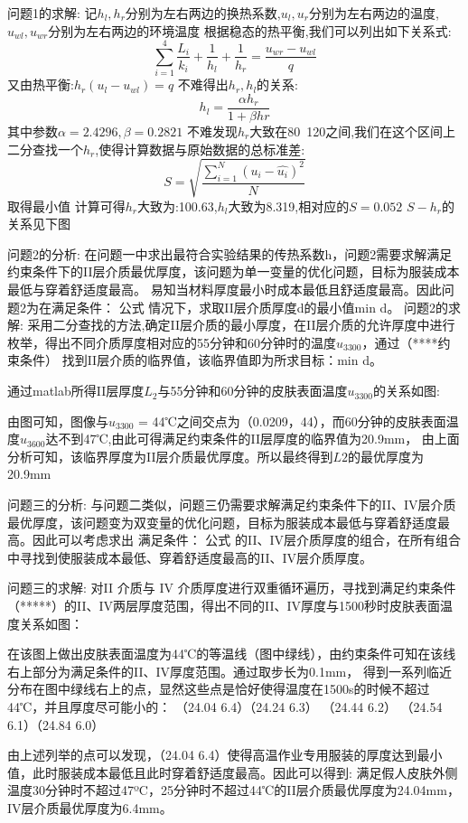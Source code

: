 \documentclass[utf8]{ctexart}
\begin{document}
    问题1的求解:
    记\(h_l,h_r\)分别为左右两边的换热系数,\(u_l,u_r\)分别为左右两边的温度,\(u_{wl},u_{wr}\)分别为左右两边的环境温度
    根据稳态的热平衡,我们可以列出如下关系式:
    \[\sum_{i=1}^4 \frac{L_i}{k_i} + \frac{1}{h_l} + \frac{1}{h_r} = \frac{u_{wr}-u_{wl}}{q}\]
    又由热平衡:\( h_r(u_l-u_{wl}) = q\)
    不难得出\(h_r,h_l\)的关系:
    \[h_l = \frac{\alpha h_r}{1+\beta hr}\]
    其中参数\(\alpha = 2.4296 ,\beta = 0.2821\)
    不难发现\(h_r\)大致在80~120之间,我们在这个区间上二分查找一个\(h_r\),使得计算数据与原始数据的总标准差:
    \[S = \sqrt{\frac{\sum_{i=1}^{N}(u_i-\hat{u_i})^2}{N}}\]
    取得最小值
    计算可得\(h_r\)大致为:100.63,\(h_l\)大致为8.319,相对应的\(S = 0.052\)
    \(S-h_r\)的关系见下图

    问题2的分析:
    在问题一中求出最符合实验结果的传热系数h，问题2需要求解满足约束条件下的II层介质最优厚度，该问题为单一变量的优化问题，目标为服装成本最低与穿着舒适度最高。
    易知当材料厚度最小时成本最低且舒适度最高。因此问题2为在满足条件：
                            公式
    情况下，求取II层介质厚度d的最小值min d。
    问题2的求解:
    采用二分查找的方法,确定II层介质的最小厚度，在II层介质的允许厚度中进行枚举，得出不同介质厚度相对应的55分钟和60分钟时的温度\(u_{3300}\)，通过（****约束条件）
    找到II层介质的临界值，该临界值即为所求目标：min d。

    通过matlab所得II层厚度\(L_2\)与55分钟和60分钟的皮肤表面温度\(u_{3300}\)的关系如图:



    由图可知，图像与\(u_{3300}\) = 44℃之间交点为（0.0209，44），而60分钟的皮肤表面温度\(u_{3600}\)达不到47℃,由此可得满足约束条件的II层厚度的临界值为20.9mm，
    由上面分析可知，该临界厚度为II层介质最优厚度。所以最终得到\(L2\)的最优厚度为20.9mm



    问题三的分析:
    与问题二类似，问题三仍需要求解满足约束条件下的II、IV层介质最优厚度，该问题变为双变量的优化问题，目标为服装成本最低与穿着舒适度最高。因此可以考虑求出
    满足条件：
                            公式
    的II、IV层介质厚度的组合，在所有组合中寻找到使服装成本最低、穿着舒适度最高的II、IV层介质厚度。
    
    问题三的求解:
    对II 介质与 IV 介质厚度进行双重循环遍历，寻找到满足约束条件（*****）的II、IV两层厚度范围，得出不同的II、IV厚度与1500秒时皮肤表面温度关系如图：
     

    在该图上做出皮肤表面温度为44℃的等温线（图中绿线），由约束条件可知在该线右上部分为满足条件的II、IV厚度范围。通过取步长为0.1mm，
    得到一系列临近分布在图中绿线右上的点，显然这些点是恰好使得温度在1500s的时候不超过44℃，并且厚度尽可能小的：
    （24.04 6.4）（24.24 6.3） （24.44 6.2） （24.54 6.1）（24.84 6.0）

    由上述列举的点可以发现，（24.04 6.4）使得高温作业专用服装的厚度达到最小值，此时服装成本最低且此时穿着舒适度最高。因此可以得到:
    满足假人皮肤外侧温度30分钟时不超过47ºC，25分钟时不超过44℃的II层介质最优厚度为24.04mm，IV层介质最优厚度为6.4mm。
\end{document}
